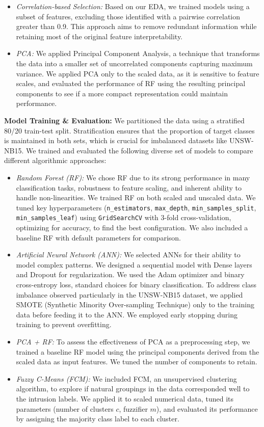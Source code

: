 \documentclass[sigconf,screen,final,nonacm]{acmart}
\newcommand{\circled}[1]{%
  \tikz[baseline=(char.base)]{
    \node[shape=circle, fill=black, text=white, inner sep=1pt, minimum size=1.5em] (char) {#1};
  }%
}
\begin{document}
        \begin{itemize}
            \item \textit{Correlation-based Selection:} Based on our EDA, we trained models using a subset of features, excluding those identified with a pairwise correlation greater than 0.9. This approach aims to remove redundant information while retaining most of the original feature interpretability.
            \item \textit{PCA:} We applied Principal Component Analysis, a technique that transforms the data into a smaller set of uncorrelated components capturing maximum variance. We applied PCA only to the scaled data, as it is sensitive to feature scales, and evaluated the performance of RF using the resulting principal components to see if a more compact representation could maintain performance.
        \end{itemize}
    \circled{6} \textbf{Model Training \& Evaluation:} We partitioned the data using a stratified 80/20 train-test split. Stratification ensures that the proportion of target classes is maintained in both sets, which is crucial for imbalanced datasets like UNSW-NB15. We trained and evaluated the following diverse set of models to compare different algorithmic approaches:
        \begin{itemize}
            \item \textit{Random Forest (RF):} We chose RF due to its strong performance in many classification tasks, robustness to feature scaling, and inherent ability to handle non-linearities. We trained RF on both scaled and unscaled data. We tuned key hyperparameters (\texttt{n\_estimators}, \texttt{max\_depth}, \texttt{min\_samples\_split}, \texttt{min\_samples\_leaf}) using \texttt{GridSearchCV} with 3-fold cross-validation, optimizing for accuracy, to find the best configuration. We also included a baseline RF with default parameters for comparison.
            \item \textit{Artificial Neural Network (ANN):} We selected ANNs for their ability to model complex patterns. We designed a sequential model with Dense layers and Dropout for regularization. We used the Adam optimizer and binary cross-entropy loss, standard choices for binary classification. To address class imbalance observed particularly in the UNSW-NB15 dataset, we applied SMOTE (Synthetic Minority Over-sampling Technique) only to the training data before feeding it to the ANN. We employed early stopping during training to prevent overfitting.
            \item \textit{PCA + RF:} To assess the effectiveness of PCA as a preprocessing step, we trained a baseline RF model using the principal components derived from the scaled data as input features. We tuned the number of components to retain.
            \item \textit{Fuzzy C-Means (FCM):} We included FCM, an unsupervised clustering algorithm, to explore if natural groupings in the data corresponded well to the intrusion labels. We applied it to scaled numerical data, tuned its parameters (number of clusters $c$, fuzzifier $m$), and evaluated its performance by assigning the majority class label to each cluster.
        \end{itemize}
\end{document}
